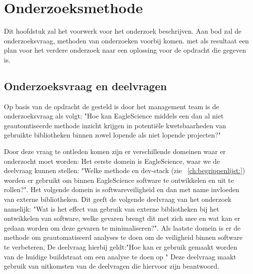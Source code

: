 \chapter{Onderzoeksmethode}\label{ch:onderzoeksmethode}
Dit hoofdstuk zal het voorwerk voor het onderzoek beschrijven. Aan bod zal de onderzoeksvraag, methoden van onderzoeken voorbij komen. met als resultaat een plan voor het verdere onderzoek naar een oplossing voor de opdracht die gegeven is.


\section{Onderzoeksvraag en deelvragen}
Op basis van de opdracht de gesteld is door het management team is de onderzoeksvraag als volgt: "Hoe kan EagleScience middels een dan al niet geautomtiseerde methode inzicht krijgen in potentiële kwetsbaarheden van gebruikte bibliotheken binnen zowel lopende als niet lopende projecten?"

Door deze vraag te ontleden komen zijn er verschillende domeinen waar er onderzocht moet worden:
Het eerste domein is EagleScience, waar we de deelvraag kunnen stellen: "Welke methode en dev-stack (zie ~\ref{ch:begrippenlijst:}) worden er gebruikt om binnen EagleScience software te ontwikkelen en uit te rollen?". Het volgende domein is softwareveiligheid en dan met name invloeden van externe bibliotheken. Dit geeft de volgende deelvraag van het onderzoek namelijk: "Wat is het effect van gebruik van externe bibliotheken bij het ontwikkelen van software, welke gevaren brengt dit met zich mee en wat kan er gedaan worden om deze gevaren te minimaliseren?". Als laatste domein is er de methode om geautomatiseerd analyses te doen om de veiligheid binnen software te verbeteren, De deelvraag hierbij geldt:"Hoe kan er gebruik gemaakt worden van de huidige buildstraat om een analyse te doen op " Deze deelvraag maakt gebruik van uitkomsten van de deelvragen die hiervoor zijn beantwoord.

